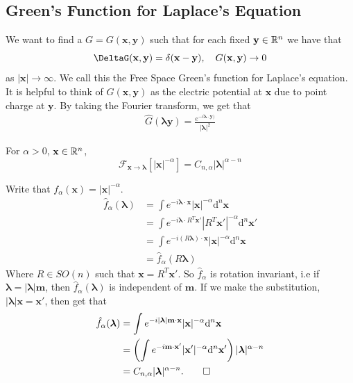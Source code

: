 \documentclass{article}
\begin{document}
\subsection{Green's Function for Laplace's Equation}
We want to find a $ G=G(\mathbf x,\mathbf y) $ such that for each fixed $ \mathbf y\in\mathbb{R}^n $ we have that
\[
  \DeltaG(\mathbf x,\mathbf y)=\delta(\mathbf x-\mathbf y),\quad G(\mathbf x,\mathbf y)\to 0
\]
as $ |\mathbf x|\to \infty $. We call this the Free Space Green's function for Laplace's equation. It is helpful to think of $ G(\mathbf x,\mathbf y) $ as the electric potential at $ \mathbf x $ due to point charge at $ \mathbf y $. By taking the Fourier transform, we get that
\begin{align*}
\hat G(\boldsymbol\lambda \mathbf y)=\frac{e^{-i\boldsymbol\lambda\cdot\mathbf y)}}{|\boldsymbol\lambda|^2}
\end{align*}
\begin{proposition}
	For $ \alpha>0 $, $ \mathbf x\in \mathbb{R}^n $, 
\[
\mathcal F_{\mathbf x\to\boldsymbol\lambda}[|\mathbf x|^{-\alpha}]=C_{n,\alpha}|\boldsymbol\lambda|^{\alpha-n}
\]
\end{proposition}
\pf Write that $ f_\alpha(\mathbf x)=|\mathbf x|^{-\alpha} $.
\begin{align*}
	\hat f_\alpha(\boldsymbol \lambda) &=\int e^{-i\boldsymbol\lambda\cdot \mathbf x}|\mathbf x|^{-\alpha}\mathrm d^n\mathbf x\\
					   &=\int e^{-i\boldsymbol \lambda\cdot R^T\mathbf x'}|R^T\mathbf x'|^{-\alpha}\mathrm d^n\mathbf x'\\
					   &=\int e^{-i(R\boldsymbol\lambda)\cdot\mathbf x}|\mathbf x|^{-\alpha}\mathrm d^n\mathbf x\\
					   &= \hat f_\alpha(R\boldsymbol\lambda)
\end{align*}
Where $ R\in SO(n) $ such that $ \mathbf x = R^T\mathbf x' $. So $ \hat f_\alpha $ is rotation invariant, i.e if $ \boldsymbol\lambda=|\boldsymbol\lambda|\mathbf m $, then $ \hat f_\alpha(\boldsymbol\lambda) $ is independent of $ \mathbf m $. If we make the substitution, $ |\boldsymbol \lambda|\mathbf x=\mathbf x' $, then get that
\begin{align*}
	\hat f_\alpha(\boldsymbol \lambda)&=\int e^{-i|\boldsymbol\lambda|\mathbf m\cdot\mathbf x}|\mathbf x|^{-\alpha}\mathrm d^n\mathbf x\\
					  &= \left(\int e^{-i\mathbf m\cdot\mathbf x'}|\mathbf x'|^{-\alpha}\mathrm d^n\mathbf x'\right)|\boldsymbol\lambda |^{\alpha-n}\\
					  &= C_{n,\alpha}|\boldsymbol\lambda|^{\alpha-n}.\qed
\end{align*}
\end{document}
